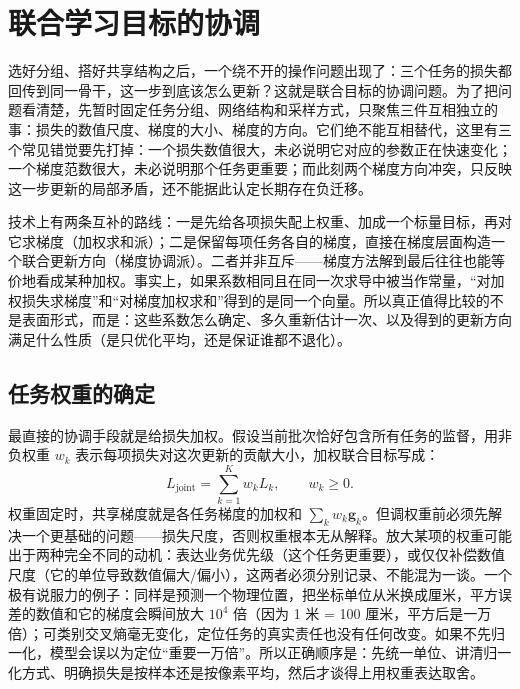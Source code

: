 \section{联合学习目标的协调}
\label{sec:ket-sharing-objectives}

选好分组、搭好共享结构之后，一个绕不开的操作问题出现了：三个任务的损失都回传到同一骨干，这一步到底该怎么更新？这就是联合目标的协调问题。为了把问题看清楚，先暂时固定任务分组、网络结构和采样方式，只聚焦三件互相独立的事：损失的数值尺度、梯度的大小、梯度的方向。它们绝不能互相替代，这里有三个常见错觉要先打掉：一个损失数值很大，未必说明它对应的参数正在快速变化；一个梯度范数很大，未必说明那个任务更重要；而此刻两个梯度方向冲突，只反映这一步更新的局部矛盾，还不能据此认定长期存在负迁移。

技术上有两条互补的路线：一是先给各项损失配上权重、加成一个标量目标，再对它求梯度（加权求和派）；二是保留每项任务各自的梯度，直接在梯度层面构造一个联合更新方向（梯度协调派）。二者并非互斥——梯度方法解到最后往往也能等价地看成某种加权。事实上，如果系数相同且在同一次求导中被当作常量，“对加权损失求梯度”和“对梯度加权求和”得到的是同一个向量。所以真正值得比较的不是表面形式，而是：这些系数怎么确定、多久重新估计一次、以及得到的更新方向满足什么性质（是只优化平均，还是保证谁都不退化）。

\subsection{任务权重的确定}
\label{sec:ket-sharing-weights}

最直接的协调手段就是给损失加权。假设当前批次恰好包含所有任务的监督，用非负权重 $w_k$ 表示每项损失对这次更新的贡献大小，加权联合目标写成：
\begin{equation}
  L_{\mathrm{joint}}
  =\sum_{k=1}^{K}w_kL_k,
  \qquad w_k\geq0.
  \label{eq:ket-sharing-weighted-loss}
\end{equation}
权重固定时，共享梯度就是各任务梯度的加权和 $\sum_k w_k\bm g_k$。但调权重前必须先解决一个更基础的问题——损失尺度，否则权重根本无从解释。放大某项的权重可能出于两种完全不同的动机：表达业务优先级（这个任务更重要），或仅仅补偿数值尺度（它的单位导致数值偏大/偏小），这两者必须分别记录、不能混为一谈。一个极有说服力的例子：同样是预测一个物理位置，把坐标单位从米换成厘米，平方误差的数值和它的梯度会瞬间放大 $10^4$ 倍（因为 1 米 = 100 厘米，平方后是一万倍）；可类别交叉熵毫无变化，定位任务的真实责任也没有任何改变。如果不先归一化，模型会误以为定位“重要一万倍”。所以正确顺序是：先统一单位、讲清归一化方式、明确损失是按样本还是按像素平均，然后才谈得上用权重表达取舍。

